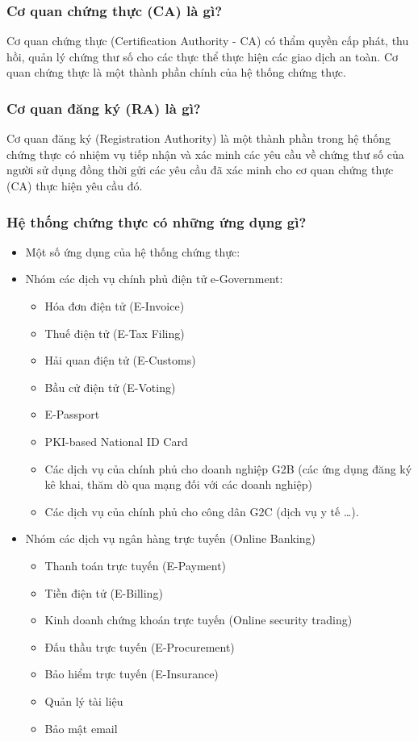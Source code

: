 \documentclass[a4paper,12pt]{report}
\begin{document}
\subsubsection{Cơ quan chứng thực (CA) là gì?}
Cơ quan chứng thực (Certification Authority - CA) có thẩm quyền cấp phát, thu hồi, quản lý chứng thư số cho các thực thể thực hiện các giao dịch an toàn. Cơ quan chứng thực là một thành phần chính của hệ thống chứng thực.
\subsubsection{Cơ quan đăng ký (RA) là gì?}
Cơ quan đăng ký (Registration Authority) là một thành phần trong hệ thống chứng thực có nhiệm vụ tiếp nhận và xác minh các yêu cầu về chứng thư số của người sử dụng đồng thời gửi các yêu cầu đã xác minh cho cơ quan chứng thực (CA) thực hiện yêu cầu đó.
\subsubsection{Hệ thống chứng thực có những ứng dụng gì?}
\begin{itemize}
\item Một số ứng dụng của hệ thống chứng thực:
\item Nhóm các dịch vụ chính phủ điện tử e-Government:
\begin{itemize}
\item Hóa đơn điện tử (E-Invoice)
\item Thuế điện tử (E-Tax Filing)
\item Hải quan điện tử (E-Customs)
\item Bầu cử điện tử (E-Voting)
\item E-Passport
\item PKI-based National ID Card
\item Các dịch vụ của chính phủ cho doanh nghiệp G2B (các ứng dụng đăng ký kê khai, thăm dò qua mạng đối với các doanh nghiệp)
\item  Các dịch vụ của chính phủ cho công dân G2C (dịch vụ y tế \ldots).
\end{itemize}
\item Nhóm các dịch vụ ngân hàng trực tuyến (Online Banking)
\begin{itemize}
\item Thanh toán trực tuyến (E-Payment)
\item Tiền điện tử (E-Billing)
\end{itemize}
\begin{itemize}
\item Kinh doanh chứng khoán trực tuyến (Online security trading)
\item Đấu thầu trực tuyến (E-Procurement)
\item Bảo hiểm trực tuyến (E-Insurance)
\item Quản lý tài liệu
\item Bảo mật email
\end{itemize}
\end{itemize}
\end{document}
